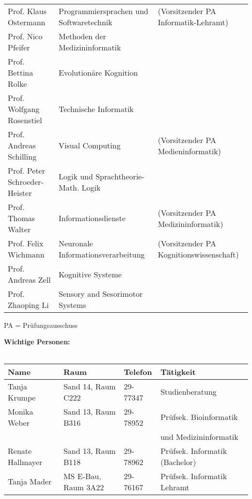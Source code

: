\begin{tabular}{|lll|}
Prof. Klaus Ostermann	      & Programmiersprachen und Softwaretechnik &(Vorsitzender PA Informatik-Lehramt) \\
Prof. Nico Pfeifer			  & Methoden der Medizininformatik &\\
Prof. Bettina Rolke 		  & Evolutionäre Kognition &\\
Prof. Wolfgang Rosenstiel     & Technische Informatik			 &\\
Prof. Andreas Schilling       & Visual Computing &(Vorsitzender PA Medieninformatik)\\
Prof. Peter Schroeder-Heister & Logik und Sprachtheorie-Math. Logik & \\
Prof. Thomas Walter           & Informationsdienste			 & (Vorsitzender PA Medizininformatik) \\
Prof. Felix Wichmann          & Neuronale Informationsverarbeitung &  (Vorsitzender PA Kognitionswissenschaft)	\\
Prof. Andreas Zell            & Kognitive Systeme 		 &\\
Prof. Zhaoping Li			  & Sensory and Sesorimotor Systems &\\
\hline
\end{tabular}
\scriptsize{PA = Prüfungsausschuss}


\textbf{Wichtige Personen:}\\\\
\begin{tabular}{|llll|}
\hline
Name                  & Raum		       & Telefon    & Tätigkeit \hfill\\
\hline
\hline
Tanja Krumpe	      & Sand 14, Raum C222    & 29-77347   & Studienberatung\\
Monika Weber          & Sand 13, Raum B316    & 29-78952   & Prüfsek. Bioinformatik\\
                      &                       &            & und Medizininformatik \\
Renate Hallmayer      & Sand 13, Raum B118    & 29-78962   & Prüfsek. Informatik (Bachelor) \\
Tanja Mader      & MS E-Bau, Raum 3A22    & 29-76167   & Prüfsek. Informatik Lehramt \\
\hline
\end{tabular} \\

